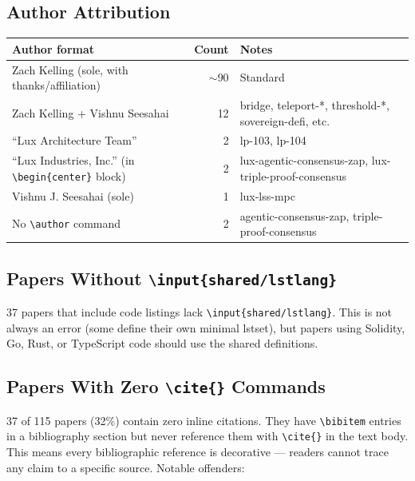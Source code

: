\documentclass[11pt,a4paper]{article}
\begin{document}
\subsection{Author Attribution}

\begin{tabular}{lrp{6cm}}
\toprule
\textbf{Author format} & \textbf{Count} & \textbf{Notes} \\
\midrule
Zach Kelling (sole, with thanks/affiliation) & $\sim$90 & Standard \\
Zach Kelling + Vishnu Seesahai & 12 & bridge, teleport-*, threshold-*, sovereign-defi, etc. \\
``Lux Architecture Team'' & 2 & lp-103, lp-104 \\
``Lux Industries, Inc.'' (in \texttt{\textbackslash begin\{center\}} block) & 2 & lux-agentic-consensus-zap, lux-triple-proof-consensus \\
Vishnu J. Seesahai (sole) & 1 & lux-lss-mpc \\
No \texttt{\textbackslash author} command & 2 & agentic-consensus-zap, triple-proof-consensus \\
\bottomrule
\end{tabular}

\subsection{Papers Without \texttt{\textbackslash input\{shared/lstlang\}}}

37 papers that include code listings lack \texttt{\textbackslash input\{shared/lstlang\}}.
This is not always an error (some define their own minimal lstset), but papers
using Solidity, Go, Rust, or TypeScript code should use the shared definitions.

\subsection{Papers With Zero \texttt{\textbackslash cite\{\}} Commands}

37 of 115 papers (32\%) contain zero inline citations. They have
\texttt{\textbackslash bibitem} entries in a bibliography section but never
reference them with \texttt{\textbackslash cite\{\}} in the text body. This
means every bibliographic reference is decorative --- readers cannot trace any
claim to a specific source. Notable offenders:
\end{document}
